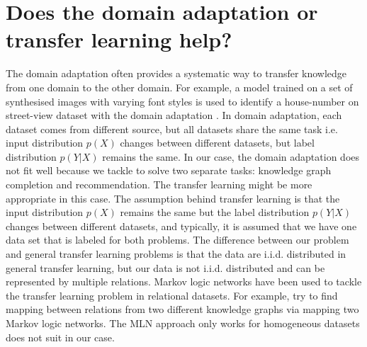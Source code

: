 \documentclass{article} %
\theoremstyle{definition}
\begin{document}


\section{Does the domain adaptation or transfer learning help?}
The domain adaptation often provides a systematic way to transfer knowledge from one domain to the other domain. For example, a model trained on a set of synthesised images with varying font styles is used to identify a house-number on street-view dataset with the domain adaptation \cite{Ganin2015}. In domain adaptation, each dataset comes from different source, but all datasets share the same task i.e. input distribution $p(X)$ changes between different datasets, but label distribution $p(Y|X)$ remains the same. In our case, the domain adaptation does not fit well because we tackle to solve two separate tasks: knowledge graph completion and recommendation. The transfer learning might be more appropriate in this case. The assumption behind transfer learning is that the input distribution $p(X)$ remains the same but the label distribution $p(Y|X)$ changes between different datasets, and typically, it is assumed that we have one data set that is labeled for both problems. The difference between our problem and general transfer learning problems is that the data are i.i.d. distributed in general transfer learning, but our data is not i.i.d. distributed and can be represented by multiple relations. Markov logic networks have been used to tackle the transfer learning problem in relational datasets. For example, \cite{Mihalkova2007} try to find mapping between relations from two different knowledge graphs via mapping two Markov logic networks. The MLN approach only works for homogeneous datasets does not suit in our case.




\end{document}
